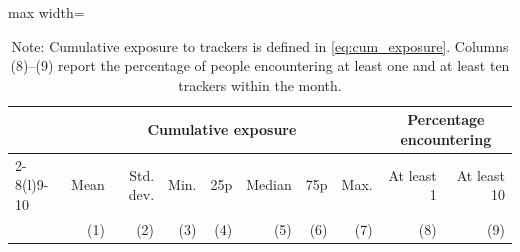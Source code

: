 \begin{table}[ht]
\centering
\small
\setlength\tabcolsep{6 pt}
\setlength{\defaultaddspace}{0pt}
\def\sym#1{\ifmmode^{#1}\else\(^{#1}\)\fi}
\caption{Summary of cumulative exposure}
\label{tab:cumulative-exposure}
\begin{adjustbox}{max width=\textwidth}
\begin{tabular}{@{\hspace{0\tabcolsep}}lrrrrrrrrr@{\hspace{0\tabcolsep}}}
    \toprule\toprule
    &\multicolumn{7}{c}{Cumulative exposure}&\multicolumn{2}{c}{Percentage encountering}\\
    \cmidrule(lr){2-8}\cmidrule(l){9-10}
    & Mean & Std. dev. & Min. & 25p & Median & 75p & Max. & At least 1 & At least 10\\
    &\multicolumn{1}{r}{(1)}         &\multicolumn{1}{r}{(2)}         &\multicolumn{1}{r}{(3)}         &\multicolumn{1}{r}{(4)}         &\multicolumn{1}{r}{(5)}         &\multicolumn{1}{r}{(6)}         &\multicolumn{1}{r}{(7)}&\multicolumn{1}{r}{(8)}&\multicolumn{1}{r}{(9)}\\
    \midrule
    
   \bottomrule
\end{tabular}
\end{adjustbox}
\caption*{\footnotesize Note:
    Cumulative exposure to trackers is defined in \cref{eq:cum_exposure}.
    Columns (8)--(9) report the percentage of people encountering at least one and at least ten trackers within the month.
}
\end{table}
